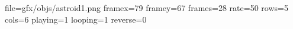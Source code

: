 file=gfx/objs/astroid1.png
framex=79
framey=67
frames=28
rate=50
rows=5
cols=6
playing=1
looping=1
reverse=0